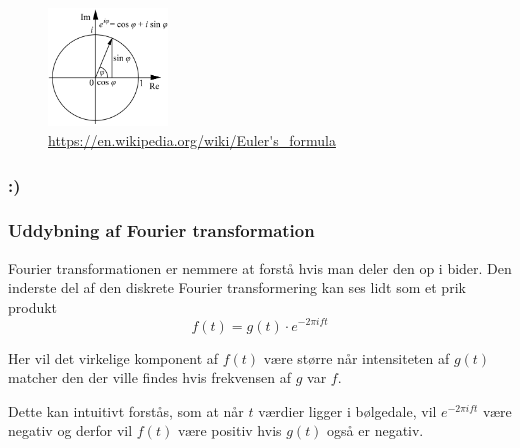 \documentclass[11pt,a4paper]{article}
\begin{document}
\begin{figure}[htbp]
\centering
\includegraphics[width=120]{./eulers_formula.png}
\caption{\url{https://en.wikipedia.org/wiki/Euler's\_formula}}
\end{figure}

\subsubsection{:)}
\label{sec:org6eba5ed}
\newpage

\subsubsection{Uddybning af Fourier transformation}
\label{sec:org02844df}

Fourier transformationen er nemmere at forstå hvis man deler den op i bider.
Den inderste del af den diskrete Fourier transformering kan ses lidt som et prik produkt
$$
f(t) = g(t) \cdot e ^{-2\pi ift}
$$

Her vil det virkelige komponent af \(f(t)\) være større når intensiteten af \(g(t)\)
matcher den der ville findes hvis frekvensen af \(g\) var \(f\).

Dette kan intuitivt forstås, som at når \(t\) værdier ligger i bølgedale, vil \(e^{-2\pi ift}\) være negativ
og derfor vil \(f(t)\) være positiv hvis \(g(t)\) også er negativ.
\end{document}

